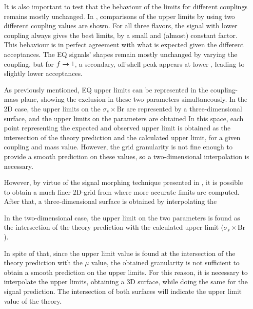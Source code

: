 It is also important to test that the behaviour of the limits for different couplings remains mostly unchanged.
In \Fig{\ref{fig:results:results:bkgsig:results:qstar:limits_couplings_comparison}}, comparisons of the upper limits by using two different coupling values are shown. For all three flavors, the signal with lower coupling always gives the best limits, by a small and (almost) constant factor. This behaviour is in perfect agreement with what is expected given the different acceptances. The \ac{EQ} signals' shapes remain mostly unchanged by varying the coupling, but for \(f\rightarrow 1\), a secondary, off-shell peak appears at lower \myj, leading to slightly lower acceptances.


As previously mentioned, \ac{EQ} upper limits can be represented in the coupling-mass plane, showing the exclusion in these two parameters simultaneously.
In the 2D case, the upper limits on the \(\sigma_s \times \text{Br}\) are represented by a three-dimensional surface, and the upper limits on the parameters are obtained 
In this space, each point representing the expected and observed upper limit is obtained as the intersection of the theory prediction and the calculated upper limit, for a given coupling and mass value. However, the grid granularity is not fine enough to provide a smooth prediction on these values, so a two-dimensional interpolation is necessary. 

However, by virtue of the signal morphing technique presented in \Sect{\ref{sec:signals:modeling}}, it is possible to obtain a much finer 2D-grid from where more accurate limits are computed. After that, a three-dimensional surface is obtained by interpolating the 

In the two-dimensional case, the upper limit on the two parameters is found as the intersection of the theory prediction with the calculated upper limit (\(\sigma_s \times \text{Br}\)).

In spite of that, since the upper limit value is found at the intersection of the theory prediction with the \(\mu\) value, the obtained granularity is not sufficient to obtain a smooth prediction on the upper limits. For this reason, it is necessary to interpolate the upper limits, obtaining a 3D surface, while doing the same for the signal prediction. The intersection of both surfaces will indicate the upper limit value of the theory.




